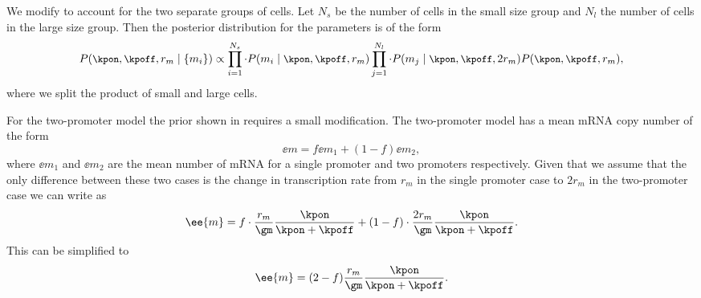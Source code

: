 We modify  to account for the two separate groups of
cells. Let $N_s$ be the number of cells in the small size group and $N_l$ the
number of cells in the large size group. Then the posterior distribution for the
parameters is of the form
\begin{equation}
  \small
P(\kpon, \kpoff, r_m \mid \{m_i\}) \propto
  \prod_{i=1}^{N_s} \cdot P(m_i \mid \kpon, \kpoff, r_m)
  \prod_{j=1}^{N_l} \cdot P(m_j \mid \kpon, \kpoff, 2 r_m)
  P(\kpon, \kpoff, r_m),
  \label{seq_bayes_sample_double}
\end{equation}
where we split the product of small and large cells.

For the two-promoter model the prior shown in  requires
a small modification. The two-promoter model has a mean mRNA copy number of
the form
\begin{equation}
  \ee{m} = f \ee{m}_1 + (1 - f) \ee{m}_2,
  \label{seq_mean_m_double}
\end{equation}
where $\ee{m}_1$ and $\ee{m}_2$ are the mean number of mRNA for a single
promoter and two promoters respectively. Given that we assume that the only
difference between these two cases is the change in transcription rate from
$r_m$ in the single promoter case to $2 r_m$ in the two-promoter case we can
write  as
\begin{equation}
  \ee{m} = f \cdot {r_m \over \gm} {\kpon \over \kpon + \kpoff} +
      (1 -f) \cdot {2 r_m \over \gm} {\kpon \over \kpon + \kpoff}.
\end{equation}
This can be simplified to
\begin{equation}
  \ee{m} = (2 - f) {r_m \over \gm} {\kpon \over \kpon + \kpoff}.
  \label{seq_mean_m_double_rates}
\end{equation}

